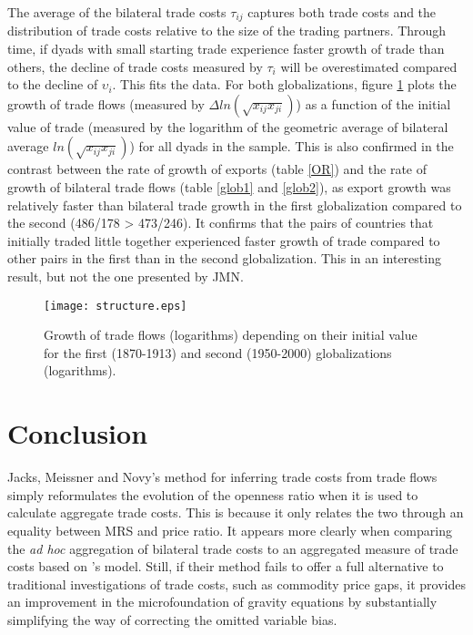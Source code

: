 \documentclass{article}
\begin{document}
The average of the bilateral trade costs $\tau_{ij}$ captures both trade
costs and the distribution of trade costs relative to the size
of the trading partners. Through time, if dyads with small starting trade experience  faster growth of trade than others, the decline of trade costs measured by $\tau_i$ will be overestimated compared to the decline of $\upsilon_i$.
This fits the data. For both globalizations, figure
\ref{structure} plots the growth of trade flows (measured by
$\Delta ln (\sqrt{x_{ij} x_{ji}})$) as a function of the
initial value of trade (measured by the logarithm of the
geometric average of bilateral average $ln(\sqrt{x_{ij}
x_{ji}})$) for all dyads in the sample. This is also confirmed in the contrast between the rate of growth of exports
(table \ref{OR}) and the rate of growth of bilateral trade flows (table \ref{glob1} and \ref{glob2}), as export growth was relatively faster than bilateral trade growth in the first globalization compared to the second (486/178 > 473/246). It confirms that the pairs of countries that initially traded little together experienced faster growth of trade compared to other pairs in the first than in the second globalization.  This in an interesting result, but not the one presented by JMN.

\begin{figure}
\centering
\texttt{[image: structure.eps]}
\caption{Growth of trade flows (logarithms) depending on their initial value for the first (1870-1913) and second (1950-2000) globalizations (logarithms).}\label{structure}
\end{figure}

\section{\label{5} Conclusion}

Jacks, Meissner and Novy's method for inferring trade costs
from trade flows simply reformulates the evolution of the
openness ratio when it is used to calculate aggregate trade
costs. This is because it only relates the two through an
equality between MRS and price ratio. It appears more clearly
when comparing the \textit{ad hoc} aggregation of bilateral trade costs
to an aggregated measure of trade costs based on
\cite{AW2003}'s model. Still, if their method fails to offer a
full alternative to traditional investigations of trade costs,
such as commodity price gaps, it provides an improvement in the
microfoundation of gravity equations by substantially
simplifying the way of correcting the omitted variable bias.
\end{document}
